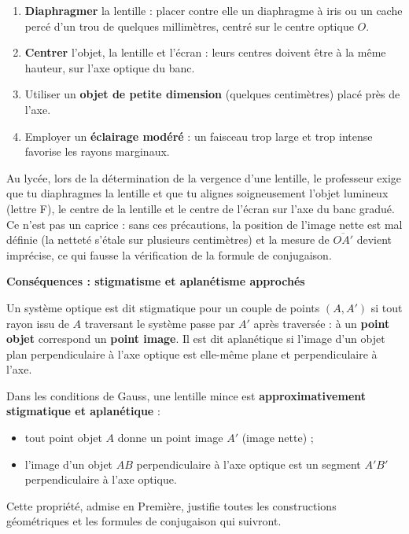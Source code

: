 \documentclass[11pt]{article}
\newcommand{\cle}[1]{{\popxbold\color{popdark}#1}}
\begin{document}
\begin{methode}
\begin{enumerate}
\item \textbf{Diaphragmer} la lentille : placer contre elle un diaphragme à iris ou un cache percé d'un trou de quelques millimètres, centré sur le centre optique $O$.
\item \textbf{Centrer} l'objet, la lentille et l'écran : leurs centres doivent être à la même hauteur, sur l'axe optique du banc.
\item Utiliser un \textbf{objet de petite dimension} (quelques centimètres) placé près de l'axe.
\item Employer un \textbf{éclairage modéré} : un faisceau trop large et trop intense favorise les rayons marginaux.
\end{enumerate}
\end{methode}

\begin{exemplebox}
Au lycée, lors de la détermination de la vergence d'une lentille, le professeur exige que tu diaphragmes la lentille et que tu alignes soigneusement l'objet lumineux (lettre F), le centre de la lentille et le centre de l'écran sur l'axe du banc gradué. Ce n'est pas un caprice : sans ces précautions, la position de l'image nette est mal définie (la netteté s'étale sur plusieurs centimètres) et la mesure de $\overline{OA'}$ devient imprécise, ce qui fausse la vérification de la formule de conjugaison.
\end{exemplebox}

\textbf{Conséquences : stigmatisme et aplanétisme approchés}\par

\begin{definition}
Un système optique est dit \cle{stigmatique} pour un couple de points $(A, A')$ si tout rayon issu de $A$ traversant le système passe par $A'$ après traversée : à un \textbf{point objet} correspond un \textbf{point image}. Il est dit \cle{aplanétique} si l'image d'un objet plan perpendiculaire à l'axe optique est elle-même plane et perpendiculaire à l'axe.
\end{definition}

\begin{propriete}
Dans les conditions de Gauss, une lentille mince est \textbf{approximativement stigmatique et aplanétique} :
\begin{itemize}
\item tout point objet $A$ donne un point image $A'$ (image nette) ;
\item l'image d'un objet $AB$ perpendiculaire à l'axe optique est un segment $A'B'$ perpendiculaire à l'axe optique.
\end{itemize}
Cette propriété, admise en Première, justifie toutes les constructions géométriques et les formules de conjugaison qui suivront.
\end{propriete}
\end{document}

